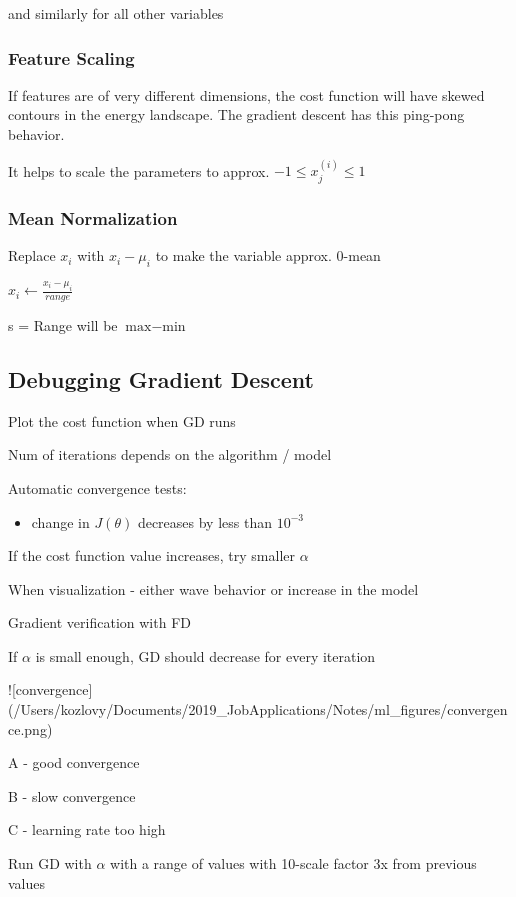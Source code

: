 {{{and similarly for all other variables

\subsubsection{Feature Scaling}

If features are of very different dimensions, the cost function will have skewed contours in the energy landscape. The gradient descent has this ping-pong behavior.  

It helps to scale the parameters to approx. $-1 \le x_j^{(i)}\le 1$

\subsubsection{Mean Normalization}

Replace $x_i$ with $x_i - \mu_i$ to make the variable approx. 0-mean

$x_i \leftarrow \frac{x_i-\mu_i}{range}$

s = Range will be $\text{max}-\text{min}$

\subsection{Debugging Gradient Descent}

Plot the cost function when GD runs

Num of iterations depends on the algorithm / model

Automatic convergence tests:

\begin{itemize}
\item change in $J(\theta)$ decreases by less than $10^{-3}$
\end{itemize}

If the cost function value increases, try smaller $\alpha$

When visualization - either wave behavior or increase in the model

Gradient verification with FD

If $\alpha$ is small enough, GD should decrease for every iteration

![convergence](/Users/kozlovy/Documents/2019_JobApplications/Notes/ml_figures/convergence.png)

A - good convergence

B - slow convergence

C - learning rate too high

Run GD with $\alpha$ with a range of values with 10-scale factor  3x from previous values

}}}
